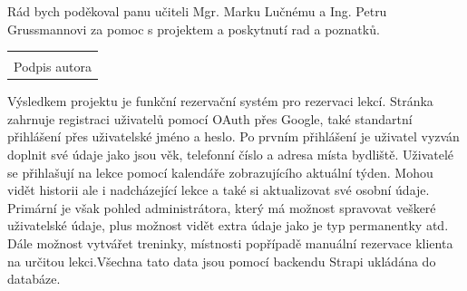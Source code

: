 \documentclass[12pt, a4paper,
openright
]{report}
\newcommand\datumOdevzdani{1. 1. 2025} %
\begin{document}
\clearpage %
	

	
	\noindent Rád bych poděkoval panu učiteli Mgr. Marku Lučnému a Ing. Petru Grussmannovi za pomoc s projektem a poskytnutí rad a poznatků.
	
	\vspace*{0.7\textheight} %

	\vfill
	\noindent{V Opavě \datumOdevzdani\\}
	\noindent
	\begin{minipage}{\linewidth}
		\hspace{9.5cm} 
		\begin{tabular}{@{}p{6cm}@{}}
			\dotfill \\
			Podpis autora
		\end{tabular}
	\end{minipage}
	
	


	\noindent Výsledkem projektu je funkční rezervační systém pro rezervaci lekcí. Stránka zahrnuje registraci uživatelů pomocí OAuth přes Google, také standartní přihlášení přes uživatelské jméno a heslo. Po prvním přihlášení je uživatel vyzván doplnit své údaje jako jsou věk, telefonní číslo a adresa místa bydliště. Uživatelé se přihlašují na lekce pomocí kalendáře zobrazujícího aktuální týden. Mohou vidět historii ale i nadcházející lekce a také si aktualizovat své osobní údaje. Primární je však pohled administrátora, který má možnost spravovat veškeré uživatelské údaje, plus možnost vidět extra údaje jako je typ permanentky atd. Dále možnost vytvářet treninky, místnosti popřípadě manuální rezervace klienta na určitou lekci.Všechna tato data jsou pomocí backendu Strapi ukládána do databáze.\\
	
\end{document}
